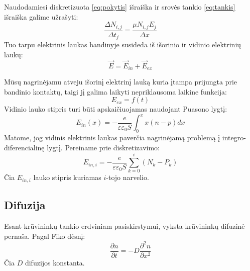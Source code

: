 Naudodamiesi diskretizuota \eqref{eq:pokytis} išraiška ir srovės tankio \eqref{eq:tankis} išraiška galime užrašyti:
\begin{equation}
\frac{\Delta N_{i,j}}{\Delta t_j} = \frac{\mu N_{i,j} E_j}{\Delta x}
\end{equation}
Tuo tarpu elektrinis laukas bandinyje susideda iš išorinio ir vidinio elektrinių laukų:
\begin{equation}
\vec{E} = \vec{E}_{in} + \vec{E}_{ex}
\end{equation}

Mūsų nagrinėjamu atveju išorinį elektrinį lauką kuria įtampa prijungta prie bandinio kontaktų, taigi jį galima laikyti nepriklausoma laikine funkcija:
\begin{equation}
	E_{ex}=f(t)
\end{equation}
Vidinio lauko stipris turi būti apskaičiuojamas naudojant Puasono lygtį:
\begin{equation}
	E_{in}(x)=-\frac{e}{\varepsilon \varepsilon_0 S} \int_{0}^{x} x(n-p)dx
\end{equation}
Matome, jog vidinis elektrinis laukas paverčia nagrinėjamą problemą į integro-diferencialinę lygtį.
Pereiname prie diskretizavimo:
\begin{equation}
	E_{in,i}=-\frac{e}{\varepsilon \varepsilon_0 S } \sum_{k=0}^{i}(N_k-P_k)
\end{equation}
Čia \(E_{in,i}\) lauko stipris kuriamas \(i\)-tojo narvelio.



\subsection{Difuzija}

Esant krūvininkų tankio erdviniam pasiskirstymui, vyksta krūvininkų difuzinė pernaša. Pagal Fiko dėsnį:
\begin{equation}
	\frac{\partial n}{\partial t}=-D \frac{\partial^2 n}{\partial x^2}
\end{equation}
Čia \(D\) difuzijos konstanta.

